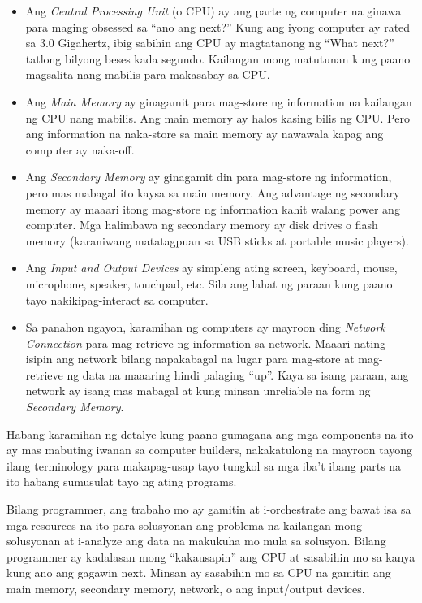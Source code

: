 \documentclass[10pt,]{book}
\begin{document}
\begin{itemize}
\item
  Ang \emph{Central Processing Unit} (o CPU) ay ang parte ng computer na
  ginawa para maging obsessed sa ``ano ang next?'' Kung ang iyong
  computer ay rated sa 3.0 Gigahertz, ibig sabihin ang CPU ay
  magtatanong ng ``What next?'' tatlong bilyong beses kada segundo.
  Kailangan mong matutunan kung paano magsalita nang mabilis para
  makasabay sa CPU.
\item
  Ang \emph{Main Memory} ay ginagamit para mag-store ng information na
  kailangan ng CPU nang mabilis. Ang main memory ay halos kasing bilis
  ng CPU. Pero ang information na naka-store sa main memory ay nawawala
  kapag ang computer ay naka-off.
\item
  Ang \emph{Secondary Memory} ay ginagamit din para mag-store ng
  information, pero mas mabagal ito kaysa sa main memory. Ang advantage
  ng secondary memory ay maaari itong mag-store ng information kahit
  walang power ang computer. Mga halimbawa ng secondary memory ay disk
  drives o flash memory (karaniwang matatagpuan sa USB sticks at
  portable music players).
\item
  Ang \emph{Input and Output Devices} ay simpleng ating screen,
  keyboard, mouse, microphone, speaker, touchpad, etc. Sila ang lahat ng
  paraan kung paano tayo nakikipag-interact sa computer.
\item
  Sa panahon ngayon, karamihan ng computers ay mayroon ding
  \emph{Network Connection} para mag-retrieve ng information sa network.
  Maaari nating isipin ang network bilang napakabagal na lugar para
  mag-store at mag-retrieve ng data na maaaring hindi palaging ``up''.
  Kaya sa isang paraan, ang network ay isang mas mabagal at kung minsan
  unreliable na form ng \emph{Secondary Memory}.
\end{itemize}

Habang karamihan ng detalye kung paano gumagana ang mga components na
ito ay mas mabuting iwanan sa computer builders, nakakatulong na mayroon
tayong ilang terminology para makapag-usap tayo tungkol sa mga iba't
ibang parts na ito habang sumusulat tayo ng ating programs.

Bilang programmer, ang trabaho mo ay gamitin at i-orchestrate ang bawat
isa sa mga resources na ito para solusyonan ang problema na kailangan
mong solusyonan at i-analyze ang data na makukuha mo mula sa solusyon.
Bilang programmer ay kadalasan mong ``kakausapin'' ang CPU at sasabihin
mo sa kanya kung ano ang gagawin next. Minsan ay sasabihin mo sa CPU na
gamitin ang main memory, secondary memory, network, o ang input/output
devices.
\end{document}
